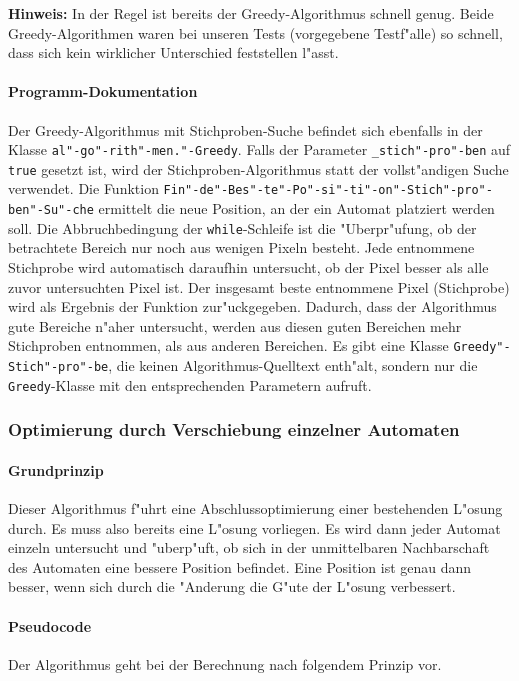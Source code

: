 \textbf{Hinweis:} In der Regel ist bereits der Greedy-Algorithmus schnell genug. Beide Greedy-Algorithmen waren bei unseren Tests (vorgegebene Testf"alle) so schnell, dass sich kein wirklicher Unterschied feststellen l"asst. 

\paragraph{Programm-Dokumentation}
Der Greedy-Algorithmus mit Stichproben-Suche befindet sich ebenfalls in der Klasse \texttt{al"-go"-rith"-men."-Greedy}. Falls der Parameter \texttt{\_stich"-pro"-ben} auf \texttt{true} gesetzt ist, wird der Stichproben-Algorithmus statt der vollst"andigen Suche verwendet. Die Funktion \texttt{Fin"-de"-Bes"-te"-Po"-si"-ti"-on"-Stich"-pro"-ben"-Su"-che} ermittelt die neue Position, an der ein Automat platziert werden soll. Die Abbruchbedingung der \texttt{while}-Schleife ist die "Uberpr"ufung, ob der betrachtete Bereich nur noch aus wenigen Pixeln besteht. Jede entnommene Stichprobe wird automatisch daraufhin untersucht, ob der Pixel besser als alle zuvor untersuchten Pixel ist. Der insgesamt beste entnommene Pixel (Stichprobe) wird als Ergebnis der Funktion zur"uckgegeben. Dadurch, dass der Algorithmus gute Bereiche n"aher untersucht, werden aus diesen guten Bereichen mehr Stichproben entnommen, als aus anderen Bereichen. Es gibt eine Klasse \texttt{Greedy"-Stich"-pro"-be}, die keinen Algorithmus-Quelltext enth"alt, sondern nur die \texttt{Greedy}-Klasse mit den entsprechenden Parametern aufruft. 

\subsubsection{Optimierung durch Verschiebung einzelner Automaten}
\paragraph{Grundprinzip}
Dieser Algorithmus f"uhrt eine Abschlussoptimierung einer bestehenden L"osung durch. Es muss also bereits eine L"osung vorliegen. Es wird dann jeder Automat einzeln untersucht und "uberp"uft, ob sich in der unmittelbaren Nachbarschaft des Automaten eine bessere Position befindet. Eine Position ist genau dann besser, wenn sich durch die "Anderung die G"ute der L"osung verbessert.

\paragraph{Pseudocode}
Der Algorithmus geht bei der Berechnung nach folgendem Prinzip vor.

